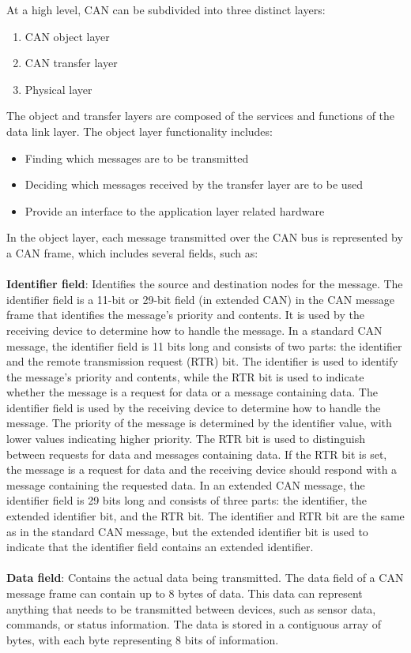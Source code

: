 \documentclass[12pt]{article}
\begin{document}
At a high level, CAN can be subdivided into three distinct layers:

\begin{enumerate}
    \item CAN object layer
    \item CAN transfer layer
    \item Physical layer
\end{enumerate}

The object and transfer layers are composed of the services and functions of the data link layer. The object layer functionality includes:

\begin{itemize}
    \item Finding which messages are to be transmitted 
    \item Deciding which messages received by the transfer layer are to be used
    \item Provide an interface to the application layer related hardware
\end{itemize}

In the object layer, each message transmitted over the CAN bus is represented by a CAN frame, which includes several fields, such as:
\\ \\
\textbf{Identifier field}: Identifies the source and destination nodes for the message. The identifier field is a 11-bit or 29-bit field (in extended CAN) in the CAN message frame that identifies the message's priority and contents. It is used by the receiving device to determine how to handle the message. In a standard CAN message, the identifier field is 11 bits long and consists of two parts: the identifier and the remote transmission request (RTR) bit. The identifier is used to identify the message's priority and contents, while the RTR bit is used to indicate whether the message is a request for data or a message containing data.
The identifier field is used by the receiving device to determine how to handle the message. The priority of the message is determined by the identifier value, with lower values indicating higher priority. The RTR bit is used to distinguish between requests for data and messages containing data. If the RTR bit is set, the message is a request for data and the receiving device should respond with a message containing the requested data.
In an extended CAN message, the identifier field is 29 bits long and consists of three parts: the identifier, the extended identifier bit, and the RTR bit. The identifier and RTR bit are the same as in the standard CAN message, but the extended identifier bit is used to indicate that the identifier field contains an extended identifier.
\\ \\
\textbf{Data field}: Contains the actual data being transmitted. The data field of a CAN message frame can contain up to 8 bytes of data. This data can represent anything that needs to be transmitted between devices, such as sensor data, commands, or status information. The data is stored in a contiguous array of bytes, with each byte representing 8 bits of information.
\end{document}
